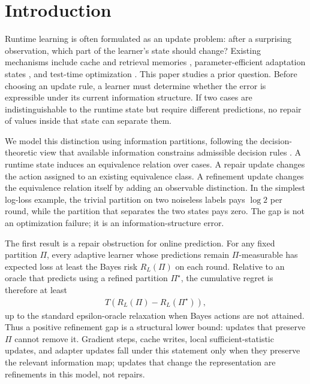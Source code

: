 \section{Introduction}
\label{sec:intro}

Runtime learning is often formulated as an update problem: after a surprising observation, which part of the learner's state should change? Existing mechanisms include cache and retrieval memories \citep{grave2017improving,khandelwal2020generalization,lewis2020retrieval}, parameter-efficient adaptation states \citep{houlsby2019parameter,hu2022lora}, and test-time optimization \citep{sun2020test,wang2021tent}. This paper studies a prior question. Before choosing an update rule, a learner must determine whether the error is expressible under its current information structure. If two cases are indistinguishable to the runtime state but require different predictions, no repair of values inside that state can separate them.

We model this distinction using information partitions, following the decision-theoretic view that available information constrains admissible decision rules \citep{blackwell1953equivalent,berger1985statistical}. A runtime state induces an equivalence relation over cases. A repair update changes the action assigned to an existing equivalence class. A refinement update changes the equivalence relation itself by adding an observable distinction. In the simplest log-loss example, the trivial partition on two noiseless labels pays $\log 2$ per round, while the partition that separates the two states pays zero. The gap is not an optimization failure; it is an information-structure error.

The first result is a repair obstruction for online prediction. For any fixed partition $\Pi$, every adaptive learner whose predictions remain $\Pi$-measurable has expected loss at least the Bayes risk $R_L(\Pi)$ on each round. Relative to an oracle that predicts using a refined partition $\Pi^\star$, the cumulative regret is therefore at least
\begin{align*}
T\left(R_L(\Pi)-R_L(\Pi^\star)\right),
\end{align*}
up to the standard epsilon-oracle relaxation when Bayes actions are not attained. Thus a positive refinement gap is a structural lower bound: updates that preserve $\Pi$ cannot remove it. Gradient steps, cache writes, local sufficient-statistic updates, and adapter updates fall under this statement only when they preserve the relevant information map; updates that change the representation are refinements in this model, not repairs.

